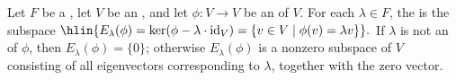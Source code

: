 \begin{definition} \label{definition:eigenspace_of_an_endomorphism_of_a_vector_space_over_a_field}
Let $F$ be a , let $V$ be an , and let $\phi : V \to V$ be an  of $V$.
For each $\lambda \in F$, the  is the subspace
$\hlin{E_\lambda(\phi) = \ker(\phi - \lambda \cdot \operatorname{id}_V) = \{v \in V \mid \phi(v) = \lambda v\}}.$
If $\lambda$ is not an  of $\phi$, then $E_\lambda(\phi) = \{0\}$; otherwise $E_\lambda(\phi)$ is a nonzero subspace of $V$ consisting of all eigenvectors corresponding to $\lambda$, together with the zero vector.
\end{definition}

